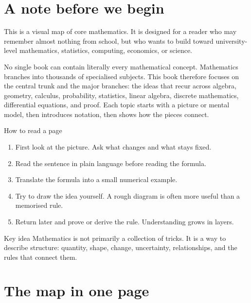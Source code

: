 \documentclass[11pt,oneside,openany]{book}
\newenvironment{keyidea}{\begin{checkpointbox}{Key idea}}{\end{checkpointbox}}
\begin{document}
\frontmatter
\chapter*{A note before we begin}

This is a visual map of core mathematics. It is designed for a reader who may remember almost nothing from school, but who wants to build toward university-level mathematics, statistics, computing, economics, or science.

No single book can contain literally every mathematical concept. Mathematics branches into thousands of specialised subjects. This book therefore focuses on the central trunk and the major branches: the ideas that recur across algebra, geometry, calculus, probability, statistics, linear algebra, discrete mathematics, differential equations, and proof. Each topic starts with a picture or mental model, then introduces notation, then shows how the pieces connect.

\begin{conceptbox}{How to read a page}
\begin{enumerate}
  \item First look at the picture. Ask what changes and what stays fixed.
  \item Read the sentence in plain language before reading the formula.
  \item Translate the formula into a small numerical example.
  \item Try to draw the idea yourself. A rough diagram is often more useful than a memorised rule.
  \item Return later and prove or derive the rule. Understanding grows in layers.
\end{enumerate}
\end{conceptbox}

\begin{keyidea}
Mathematics is not primarily a collection of tricks. It is a way to describe structure: quantity, shape, change, uncertainty, relationships, and the rules that connect them.
\end{keyidea}

\tableofcontents

\chapter*{The map in one page}
\end{document}
